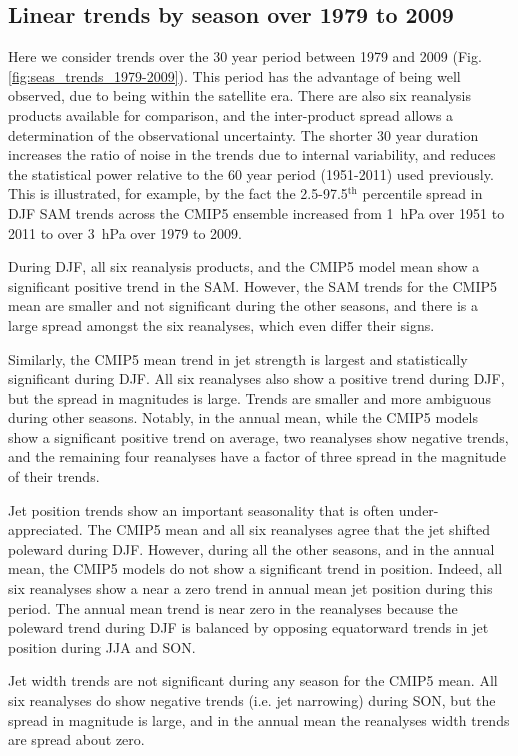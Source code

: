 \documentclass{ametsoc}
\begin{document}
\subsection{Linear trends by season over 1979 to 2009}
Here we consider trends over the 30 year period between 1979 and 2009 (Fig. \ref{fig:seas_trends_1979-2009}). 
This period has the advantage
of being well observed, due to being within the satellite era. There are also six reanalysis 
products available for comparison, and the inter-product spread allows a determination of the 
observational uncertainty. The shorter 30 year duration increases the ratio of noise 
in the trends due to internal  variability, and reduces the statistical power relative to the 
60 year period (1951-2011) used previously.  This is illustrated, for example, by the fact 
the 2.5-97.5$^\textrm{th}$ percentile spread in DJF SAM trends across the CMIP5 ensemble 
increased from 1~hPa over 1951 to 2011 to over 3~hPa over 1979 to 2009.

During DJF, all six reanalysis products, and the CMIP5 model mean show a significant positive trend
in the SAM. However, the SAM trends for the CMIP5 mean are smaller and not significant 
during the other seasons, and there is a large spread amongst the six reanalyses, 
which even differ their signs.

Similarly, the CMIP5 mean trend in jet strength is largest and statistically significant during DJF. 
All six reanalyses also show a positive trend during DJF, but the spread in magnitudes is large. 
Trends are smaller and more ambiguous during other seasons. Notably, in the annual mean, 
while the CMIP5 models show a significant positive trend on average, two reanalyses show 
negative trends, and the remaining four reanalyses have a 
factor of three spread in the magnitude of their trends.

Jet position trends show an important seasonality that is often under-appreciated. The CMIP5
mean and all six reanalyses agree that the jet shifted poleward during DJF. However, during
all the other seasons, and in the annual mean, the CMIP5 models do not show a significant trend
in position. Indeed, all six reanalyses show a near a zero trend in annual mean 
jet position during this period. The annual mean trend is near zero in the reanalyses because the 
poleward trend during DJF is balanced by opposing equatorward trends in jet position during JJA
and SON.

Jet width trends are not significant during any season for the CMIP5 mean. All six reanalyses
do show negative trends (i.e. jet narrowing) during SON, but the spread in magnitude is large,
and in the annual mean the reanalyses width trends are spread about zero.
\end{document}
